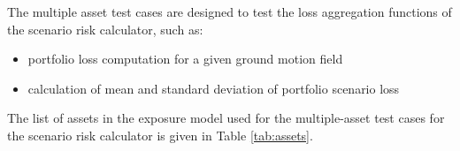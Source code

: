 The multiple asset test cases are designed to test the loss aggregation functions of the scenario risk calculator, such as:

\begin{itemize}
\item portfolio loss computation for a given ground motion field
\item calculation of mean and standard deviation of portfolio scenario loss
\end{itemize}



The list of assets in the exposure model used for the multiple-asset test cases for the scenario risk calculator is given in Table \ref{tab:assets}.